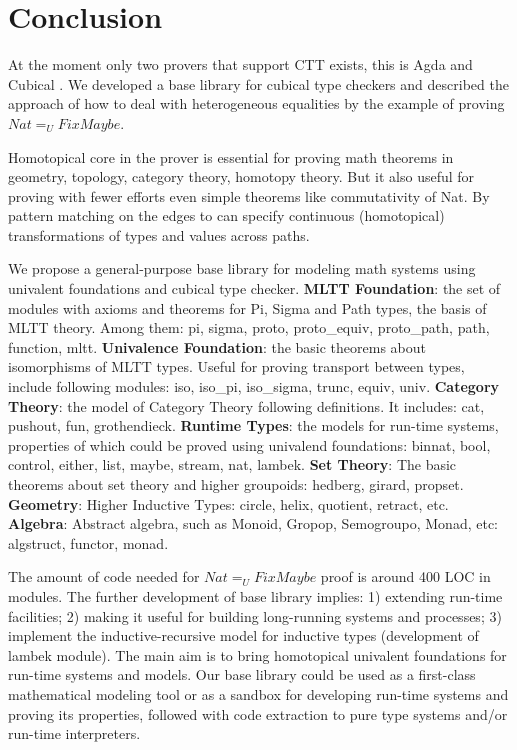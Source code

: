 \documentclass{svproc}
\begin{document}
\section{Conclusion}

At the moment only two provers that support CTT exists, this is Agda \cite{Ulf09} and Cubical \cite{Mortberg17}.
We developed a base library for cubical type checkers and described the approach
of how to deal with heterogeneous equalities by the example of proving $Nat =_U Fix Maybe$.

Homotopical core in the prover is essential for proving math theorems in geometry,
topology, category theory, homotopy theory. But it also useful
for proving with fewer efforts even simple theorems like commutativity of Nat. By pattern matching
on the edges to can specify continuous (homotopical) transformations of types
and values across paths.

We propose a general-purpose base library for modeling math systems using univalent foundations
and cubical type checker.
{\bf MLTT Foundation}: the set of modules with axioms and theorems for Pi, Sigma and Path types, the basis of MLTT theory.
                       Among them: pi, sigma, proto, proto\_equiv,
                       proto\_path, path, function, mltt.
{\bf Univalence Foundation}: the basic theorems about isomorphisms of MLTT types. Useful for
                             proving transport between types, include following modules:
                             iso, iso\_pi, iso\_sigma, trunc, equiv, univ.
{\bf Category Theory}: the model of Category Theory following \cite{HoTT} definitions. It includes:
                     cat, pushout, fun, grothendieck.
{\bf Runtime Types}: the models for run-time systems, properties of which could be proved using
                     univalend foundations: binnat, bool, control, either, list,
                     maybe, stream, nat, lambek.
{\bf Set Theory}: The basic theorems about set theory and higher groupoids:
                  hedberg, girard, propset.
{\bf Geometry}: Higher Inductive Types: circle, helix, quotient, retract, etc.
{\bf Algebra}: Abstract algebra, such as Monoid, Gropop, Semogroupo, Monad, etc: algstruct, functor, monad.

The amount of code needed for $Nat =_U Fix Maybe$ proof is around 400 LOC in modules.
The further development of base library implies: 1) extending run-time facilities;
2) making it useful for building long-running systems and processes; 3) implement the inductive-recursive model for inductive types (development of lambek module). The main aim
is to bring homotopical univalent foundations for run-time systems and models. Our base library
could be used as a first-class mathematical modeling tool or as a sandbox for developing
run-time systems and proving its properties, followed with code extraction to pure type systems
and/or run-time interpreters.



\end{document}
